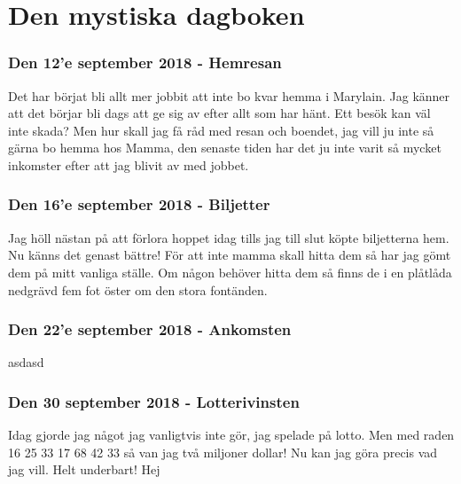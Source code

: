 
\part{Den mystiska dagboken}
\section{Den 12'e september 2018 - Hemresan}
Det har börjat bli allt mer jobbit att inte bo kvar hemma i Marylain. Jag känner att det börjar bli dags att ge sig av efter allt som har hänt. Ett besök kan väl inte skada? Men hur skall jag få råd med resan och boendet, jag vill ju inte så gärna bo hemma hos Mamma, den senaste tiden har det ju inte varit så mycket inkomster efter att jag blivit av med jobbet.
\section{Den 16'e september 2018 - Biljetter}
Jag höll nästan på att förlora hoppet idag tills jag till slut köpte biljetterna hem. Nu känns det genast bättre! För att inte mamma skall hitta dem så har jag gömt dem på mitt vanliga ställe. Om någon behöver hitta dem så finns de i en plåtlåda nedgrävd fem fot öster om den stora fontänden.
\section{Den 22'e september 2018 - Ankomsten}
asdasd

\section{Den 30 september 2018 - Lotterivinsten}
Idag gjorde jag något jag vanligtvis inte gör, jag spelade på lotto. Men med raden 16 25 33 17 68 42 33 så van jag två miljoner dollar! Nu kan jag göra precis vad jag vill. Helt underbart!
Hej
